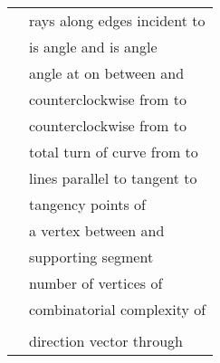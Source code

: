 \pdfoutput=1  \documentclass[]{article}
\begin{document}
\begin{tabular}{l l}
   & rays along edges incident to \\

   &  is angle  and  is angle \\

   & angle at  on  between  and  \\

   &  counterclockwise from  to  \\

   &  counterclockwise from  to \\

   & total turn of curve  from  to \\

   & lines parallel to  tangent to \\

   & tangency points of \\

   & a vertex between  and \\

   & supporting segment\\

   & number of vertices of  \\

   & combinatorial complexity of \\

   & \\
 
   & direction vector through 
\end{tabular}







\end{document}
